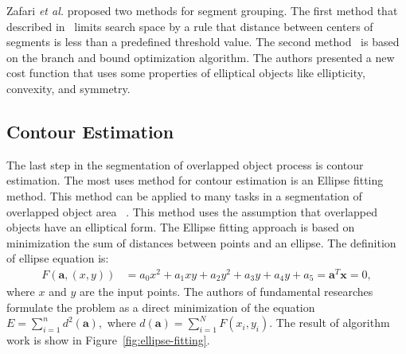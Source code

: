 \documentclass{lutmscthesis}[2010/09/22]
\begin{document}
\begin{figure}[htp]
\end{figure}

Zafari \emph{et al.} proposed two methods for segment grouping.  The first method that described in~\cite{zafari-bb} limits search space by a rule that distance between centers of segments is less than a predefined threshold value. The second method~\cite{zafari-bb} is based on the branch and bound optimization algorithm. The authors presented a new cost function that uses some properties of elliptical objects like ellipticity, convexity, and symmetry. 



\subsection{Contour Estimation}

The last step in the segmentation of overlapped object process is contour estimation. The most uses method for contour estimation is an Ellipse fitting method. This method can be applied to many tasks in a segmentation of overlapped object area ~\cite{BE-FRS,Zhao2017,zafari-bb,LANGLARD2018}. This method uses the assumption that overlapped objects have an elliptical form. The Ellipse fitting approach is based on minimization the sum of distances between points and an ellipse. The definition of ellipse equation is:
\begin{align}
    F(\textbf{a},(x,y)) &= a_0x^2 + a_1xy + a_2y^2 + a_3y + a_4y + a_5 = \textbf{a}^T \mathbf{x} = 0,
\end{align}
where $x$ and $y$ are the input points. The authors of fundamental researches~\cite{acos_1} formulate the problem as a direct minimization of the equation $E = \sum_{i=1}^{n}d^2(\textbf{a}),$
where $d(\textbf{a}) = \sum_{i=1}^N{F(x_i, y_i)}$. The result of algorithm work is show in Figure~\ref{fig:ellipse-fitting}.
\end{document}
